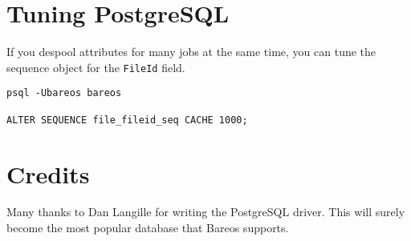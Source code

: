 \section{Tuning PostgreSQL}

If you despool attributes for many jobs at the same time, you can tune the
sequence object for the \texttt{FileId} field.
\begin{verbatim}
psql -Ubareos bareos

ALTER SEQUENCE file_fileid_seq CACHE 1000;
\end{verbatim}

\section{Credits}
Many thanks to Dan Langille for writing the PostgreSQL driver. This will
surely become the most popular database that Bareos supports.
